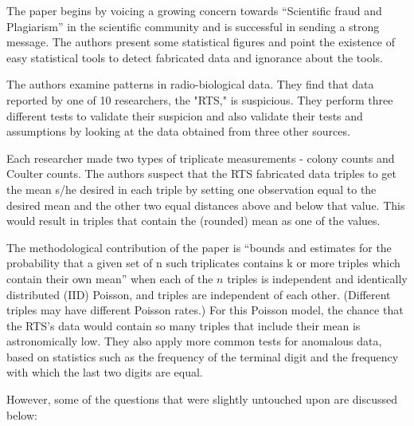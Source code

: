 \documentclass{article}
\begin{document}
The paper begins by voicing a growing concern towards ``Scientific fraud
and Plagiarism'' in the scientific community and is successful in
sending a strong message. The authors present some statistical figures and point the existence of easy statistical tools to detect fabricated data and ignorance about the tools. 

The authors examine patterns in radio-biological data. They find that data reported by one of 10 researchers, the "RTS," is suspicious. 
They perform three different
tests to validate their suspicion and also validate their tests and
assumptions by looking at the data obtained from three other sources.

Each researcher made two types of triplicate measurements - colony counts and Coulter counts.  
The authors suspect that the RTS fabricated data triples to get the mean s/he desired in each triple by setting one observation equal to the desired mean and the other two equal distances above and below that value. This would result in triples that contain the (rounded) mean as one of the values.

The methodological contribution of the paper is “bounds and estimates for the probability that a given set of n such triplicates contains k or more triples which contain their own mean” when each of the $n$ triples is independent and identically distributed (IID) Poisson, and triples are independent of each other. (Different triples may have different Poisson rates.)
For this Poisson model, the chance that the RTS's data would contain so many triples that include their mean is astronomically low.
They also apply more common tests for anomalous data, based on statistics such as the frequency of the terminal digit and the frequency with which the last two digits are equal.

However, some of the questions that were slightly untouched upon are discussed below:
\end{document}
